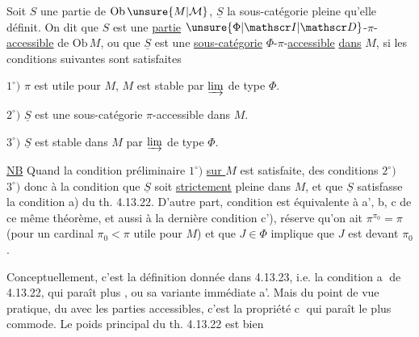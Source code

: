 
Soit $S$ une partie de $\mathrm{Ob}\,\unsure{M|\mathcal M}$, $\underline S$ la sous-catégorie pleine qu'elle définit. On dit que $S$ est une \uline{partie} $\unsure{\Phi|\mathscr I|\mathscr D}$-$\pi$-\uline{accessible} de $\mathrm{Ob}\,M$, ou que $\underline S$ est une \uline{sous-catégorie} $\Phi$-$\pi$-\uline{accessible} \uline{dans} $M$, si \unsure{,} les conditions suivantes sont satisfaites


$1^\circ)$ $\pi$ est utile pour $M$, $M$ est stable par $\varinjlim$ de type $\Phi$.

$2^\circ)$ $\underline S$ est une sous-catégorie $\pi$-accessible \unsure{:} dans $M$.

$3^\circ)$ $\underline S$ est  stable dans $M$ par $\varinjlim$ de type $\Phi$.


\uline{NB} Quand la condition préliminaire $1^\circ)$ \uline{sur $M$} est satisfaite,  des conditions $2^\circ)$ $3^\circ)$  donc à la condition que $\underline S$ soit \uline{strictement} pleine dans $M$, et que  $\underline S$ satisfasse la condition a) du th. 4.13.22. D'autre part,  condition est équivalente à    a', b, c de ce même théorème, et aussi à la dernière condition c'),  réserve qu'on ait $\pi^{\pi_0}=\pi$ (pour un cardinal $\pi_0<\pi$ utile pour $M$) et que $J\in\Phi$ implique que $J$ est  devant $\pi_0$.

Conceptuellement, c'est la définition donnée dans 4.13.23,  i.e. la condition \textcircled{a} de 4.13.22, qui paraît  plus , ou sa variante immédiate a'. Mais du point de vue pratique, du   avec les parties accessibles, c'est la propriété \textcircled{c} qui paraît le plus commode. Le poids principal du th. 4.13.22 est bien


